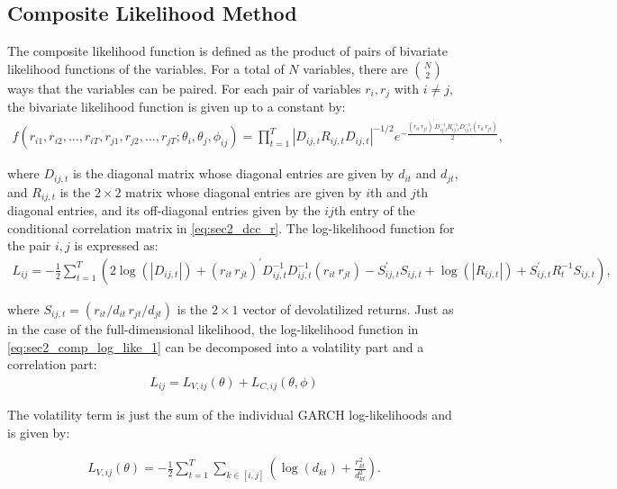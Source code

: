 \subsection{Composite Likelihood Method}

The composite likelihood function is defined as the product of pairs of bivariate likelihood functions of the variables. For a total of $N$ variables, there are $\binom{N}{2}$ ways that the variables can be paired. For each pair of variables $r_i,r_j$ with $i \neq j$, the bivariate likelihood function is given up to a constant by:
\begin{align}
	f(r_{i1},r_{i2},\dots,r_{iT},r_{j1},r_{j2},\dots,r_{jT};\theta_i,\theta_j,\phi_{ij}) =  \prod_{t=1}^T |D_{ij,t}R_{ij,t}D_{ij,t}|^{-1/2} e^{-\frac{(r_{it}\, r_{jt})^\prime D_{ij,t}^{-1}R_{ij,t}^{-1}D_{ij,t}^{-1}(r_{it}\, r_{jt})}{2}},
\end{align}

where $D_{ij,t}$ is the diagonal matrix whose diagonal entries are given by $d_{it}$ and $d_{jt}$, and $R_{ij,t}$ is the $2 \times 2$ matrix whose diagonal entries are given by $i$th and $j$th diagonal entries, and its off-diagonal entries given by the $ij$th entry of the conditional correlation matrix in \eqref{eq:sec2_dcc_r}. The log-likelihood function for the pair $i,j$ is expressed as:
\begin{align}
	L_{ij} = -\frac{1}{2} \sum_{t=1}^T \left( 2\operatorname{log}(|D_{ij,t}|) + (r_{it}\, r_{jt})^\prime D_{ij,t}^{-1}D_{ij,t}^{-1} (r_{it}\, r_{jt}) - S_{ij,t}^\prime S_{ij,t} + \operatorname{log}(|R_{ij,t}|) + S_{ij,t}^\prime R_t^{-1} S_{ij,t} \right), \label{eq:sec2_comp_log_like_1}
\end{align}

where $S_{ij,t} = (r_{it}/d_{it}\, r_{jt}/d_{jt})$ is the $2 \times 1$ vector of devolatilized returns. Just as in the case of the full-dimensional likelihood, the log-likelihood function in \eqref{eq:sec2_comp_log_like_1} can be decomposed into a volatility part and a correlation part:
\begin{align}
	L_{ij} = L_{V,ij}(\theta) + L_{C,ij}(\theta, \phi)
\end{align}

The volatility term is just the sum of the individual GARCH log-likelihoods and is given by:

\begin{align}
	L_{V,ij}(\theta) = -\frac{1}{2} \sum_{t=1}^T \sum_{k \in [i,j]} \left( \operatorname{log}(d_{kt}) + \frac{r_{kt}^2}{d_{kt}^2} \right).
\end{align}

